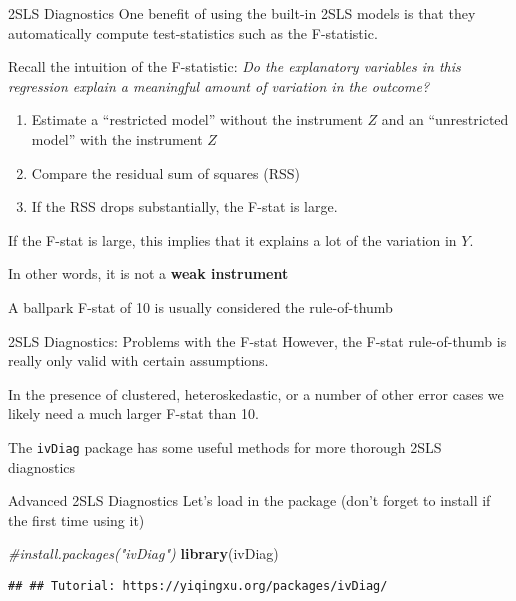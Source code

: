 \documentclass[
  ignorenonframetext,
]{beamer}
\newenvironment{Shaded}{\begin{snugshade}}{\end{snugshade}}
\newcommand{\CommentTok}[1]{\textcolor[rgb]{0.56,0.35,0.01}{\textit{#1}}}
\newcommand{\FunctionTok}[1]{\textcolor[rgb]{0.13,0.29,0.53}{\textbf{#1}}}
\newcommand{\NormalTok}[1]{#1}
\providecommand{\tightlist}{%
  \setlength{\itemsep}{0pt}\setlength{\parskip}{0pt}}
\begin{document}
\begin{frame}{2SLS Diagnostics}
\label{sls-diagnostics}
One benefit of using the built-in 2SLS models is that they automatically
compute test-statistics such as the F-statistic.

Recall the intuition of the F-statistic: \emph{Do the explanatory
variables in this regression explain a meaningful amount of variation in
the outcome?}

\begin{enumerate}
\tightlist
\item
  Estimate a ``restricted model'' without the instrument \(Z\) and an
  ``unrestricted model'' with the instrument \(Z\)
\item
  Compare the residual sum of squares (RSS)
\item
  If the RSS drops substantially, the F-stat is large.
\end{enumerate}

If the F-stat is large, this implies that it explains a lot of the
variation in \(Y\).

In other words, it is not a \textbf{weak instrument}

A ballpark F-stat of 10 is usually considered the rule-of-thumb
\end{frame}

\begin{frame}[fragile]{2SLS Diagnostics: Problems with the F-stat}
\label{sls-diagnostics-problems-with-the-f-stat}
However, the F-stat rule-of-thumb is really only valid with certain
assumptions.

In the presence of clustered, heteroskedastic, or a number of other
error cases we likely need a much larger F-stat than 10.

The \texttt{ivDiag} package has some useful methods for more thorough
2SLS diagnostics
\end{frame}

\begin{frame}[fragile]{Advanced 2SLS Diagnostics}
\label{advanced-2sls-diagnostics}
Let's load in the package (don't forget to install if the first time
using it)

\scriptsize

\begin{Shaded}
\begin{Highlighting}[]
\CommentTok{\#install.packages("ivDiag")}
\FunctionTok{library}\NormalTok{(ivDiag)}
\end{Highlighting}
\end{Shaded}

\begin{verbatim}
## ## Tutorial: https://yiqingxu.org/packages/ivDiag/
\end{verbatim}
\end{frame}
\end{document}
